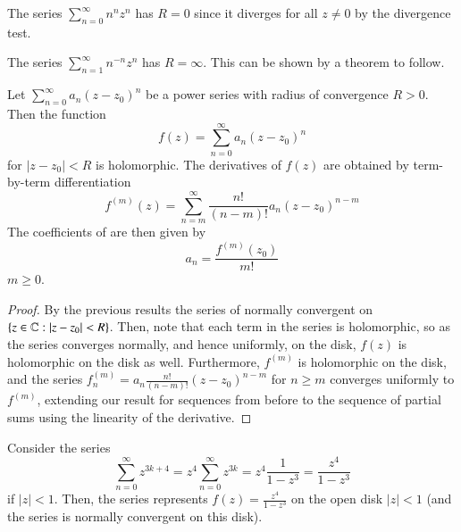 \begin{example}
    The series $\sum_{n=0}^{\infty}n^nz^n$ has $R = 0$ since it diverges for all $z \neq 0$ by the divergence test.
\end{example}
    

\begin{example}
    The series $\sum_{n=1}^{\infty}n^{-n}z^n$ has $R = \infty$. This can be shown by a theorem to follow.
\end{example}

\begin{theorem}
    Let $\sum_{n=0}^{\infty}a_n(z-z_0)^n$ be a power series with radius of convergence $R > 0$. Then the function \begin{equation*}
        f(z) = \sum_{n=0}^{\infty}a_n(z-z_0)^n
    \end{equation*}
    for $|z-z_0| < R$ is holomorphic. The derivatives of $f(z)$ are obtained by term-by-term differentiation \begin{equation*}
        f^{(m)}(z) = \sum_{n=m}^{\infty}\frac{n!}{(n-m)!}a_n(z-z_0)^{n-m}
    \end{equation*}
    The coefficients of are then given by \begin{equation*}
        a_n = \frac{f^{(m)}(z_0)}{m!}
    \end{equation*}
    $m \geq 0$.
\end{theorem}
\begin{proof}
    By the previous results the series of normally convergent on $\{z \in \mathbb C:|z-z_0| < R\}$. Then, note that each term in the series is holomorphic, so as the series converges normally, and hence uniformly, on the disk, $f(z)$ is holomorphic on the disk as well. Furthermore, $f^{(m)}$ is holomorphic on the disk, and the series $f_n^{(m)} = a_n\frac{n!}{(n-m)!}(z-z_0)^{n-m}$ for $n \geq m$ converges uniformly to $f^{(m)}$, extending our result for sequences from before to the sequence of partial sums using the linearity of the derivative. 
\end{proof}

\begin{example}
    Consider the series \begin{equation*}
        \sum_{n=0}^{\infty}z^{3k+4} = z^4\sum_{n=0}^{\infty}z^{3k} = z^4\frac{1}{1-z^3} = \frac{z^4}{1-z^3}
    \end{equation*}
    if $|z| < 1$. Then, the series represents $f(z) = \frac{z^4}{1-z^3}$ on the open disk $|z| < 1$ (and the series is normally convergent on this disk).
\end{example}


